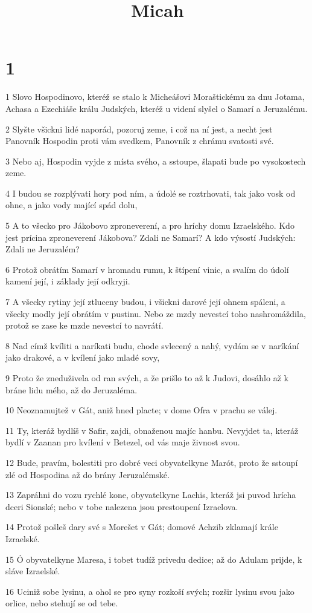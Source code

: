 

\title{Micah}

\chapter{1}

\par 1 Slovo Hospodinovo, kteréž se stalo k Micheášovi Moraštickému za dnu Jotama, Achasa a Ezechiáše králu Judských, kteréž u videní slyšel o Samarí a Jeruzalému.
\par 2 Slyšte všickni lidé naporád, pozoruj zeme, i což na ní jest, a necht jest Panovník Hospodin proti vám svedkem, Panovník z chrámu svatosti své.
\par 3 Nebo aj, Hospodin vyjde z místa svého, a sstoupe, šlapati bude po vysokostech zeme.
\par 4 I budou se rozplývati hory pod ním, a údolé se roztrhovati, tak jako vosk od ohne, a jako vody mající spád dolu,
\par 5 A to všecko pro Jákobovo zproneverení, a pro hríchy domu Izraelského. Kdo jest prícina zproneverení Jákobova? Zdali ne Samarí? A kdo výsostí Judských: Zdali ne Jeruzalém?
\par 6 Protož obrátím Samarí v hromadu rumu, k štípení vinic, a svalím do údolí kamení její, i základy její odkryji.
\par 7 A všecky rytiny její ztluceny budou, i všickni darové její ohnem spáleni, a všecky modly její obrátím v pustinu. Nebo ze mzdy nevestcí toho nashromáždila, protož se zase ke mzde nevestcí to navrátí.
\par 8 Nad címž kvíliti a naríkati budu, chode svlecený a nahý, vydám se v naríkání jako drakové, a v kvílení jako mladé sovy,
\par 9 Proto že zneduživela od ran svých, a že prišlo to až k Judovi, dosáhlo až k bráne lidu mého, až do Jeruzaléma.
\par 10 Neoznamujtež v Gát, aniž hned placte; v dome Ofra v prachu se válej.
\par 11 Ty, kteráž bydlíš v Safir, zajdi, obnaženou majíc hanbu. Nevyjdet ta, kteráž bydlí v Zaanan pro kvílení v Betezel, od vás maje živnost svou.
\par 12 Bude, pravím, bolestiti pro dobré veci obyvatelkyne Marót, proto že sstoupí zlé od Hospodina až do brány Jeruzalémské.
\par 13 Zapráhni do vozu rychlé kone, obyvatelkyne Lachis, kteráž jsi puvod hrícha dceri Sionské; nebo v tobe nalezena jsou prestoupení Izraelova.
\par 14 Protož pošleš dary své s Morešet v Gát; domové Achzib zklamají krále Izraelské.
\par 15 Ó obyvatelkyne Maresa, i tobet tudíž privedu dedice; až do Adulam prijde, k sláve Izraelské.
\par 16 Uciniž sobe lysinu, a ohol se pro syny rozkoší svých; rozšir lysinu svou jako orlice, nebo stehují se od tebe.


